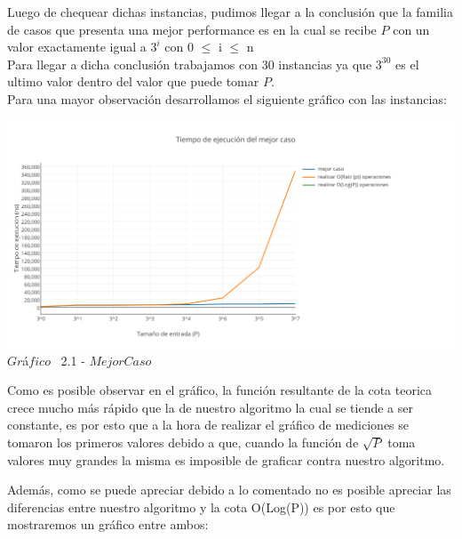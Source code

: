 Luego de chequear dichas instancias, pudimos llegar a la conclusi\'on que la familia de casos que presenta una mejor performance es en la cual se recibe $P$ con un valor exactamente igual a $3^i$ con 0 $\leq$ i $\leq$ n \\

Para llegar a dicha conclusi\'on trabajamos con 30 instancias ya que $3^{30}$ es el ultimo valor dentro del valor que puede tomar $P$.\\

Para una mayor observaci\'on desarrollamos el siguiente gr\'afico con las instancias:\\

\vspace*{0.3cm} \vspace*{0.3cm}
  \begin{center}
 \includegraphics[scale=0.65]{./EJ2/mejorcaso.png}
 {$Gr$\'a$fico$ \ 2.1 - $Mejor Caso$}
  \end{center}
  \vspace*{0.3cm}
  
Como es posible observar en el gr\'afico, la funci\'on resultante de la cota teorica crece mucho m\'as r\'apido que la de nuestro algoritmo la cual se tiende a ser constante, es por esto que a la hora de realizar el gr\'afico de mediciones se tomaron los primeros valores debido a que, cuando la funci\'on de $\sqrt{P}$ toma valores muy grandes la misma es imposible de graficar contra nuestro algoritmo.

Adem\'as, como se puede apreciar debido a lo comentado no es posible apreciar las diferencias entre nuestro algoritmo y la cota O(Log(P)) es por esto que mostraremos un gr\'afico entre ambos:\\

